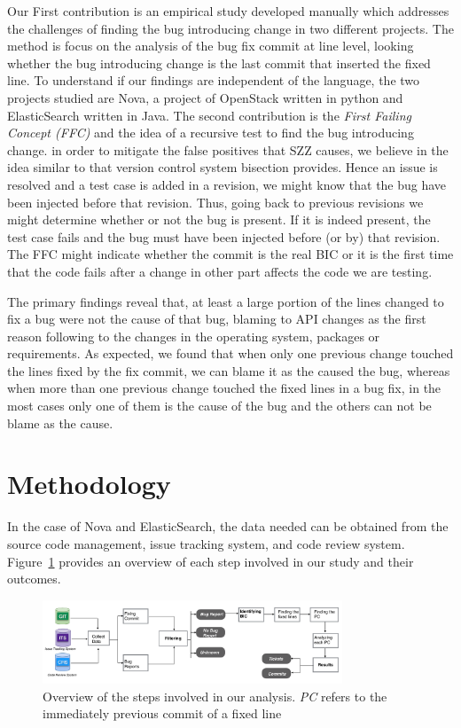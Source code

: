 \documentclass[conference]{IEEEtran}
\begin{document}
Our First contribution is an empirical study developed manually which addresses the challenges of finding the bug introducing change in two different projects. The method is focus on the analysis of the bug fix commit at line level, looking whether the bug introducing change is the last commit that inserted the fixed line. To understand if our findings are independent of the language, the two projects studied are Nova, a project of OpenStack written in python and ElasticSearch written in Java. The second contribution is the \emph{First Failing Concept (FFC)} and the idea of a recursive test to find the bug introducing change. in order to mitigate the false positives that SZZ causes, we believe in the idea similar to that version control system bisection provides. Hence an issue is resolved and a test case is added in a revision, we might know that the bug have been injected before that revision. Thus, going back to previous revisions we might determine whether or not the bug is present. If it is indeed present, the test case fails and the bug must have been injected before (or by) that revision. The FFC might indicate whether the commit is the real BIC or it is the first time that the code fails after a change in other part affects the code we are testing.

The primary findings reveal that, at least a large portion of the lines changed to fix a bug were not the cause of that bug, blaming to API changes as the first reason following to the changes in the operating system, packages or requirements. As expected, we found that when only one previous change touched the lines fixed by the fix commit, we can blame it as the caused the bug, whereas when more than one previous change touched the fixed lines in a bug fix, in the most cases only one of them is the cause of the bug and the others can not be blame as the cause.


\section{Methodology}
\label{sec:methodology}
In the case of Nova and ElasticSearch, the data needed can be obtained from the source code management, issue tracking system, and code review system. Figure~\ref{fig:diagram} provides an overview of each step involved in our study and their outcomes.
\begin{figure}[ht]
\centering
\includegraphics[height=2.5cm]{diagram.png}
\caption{Overview of the steps involved in our analysis. \emph{PC} refers to the immediately previous commit of a fixed line }
\label{fig:diagram}       %
\end{figure}
\end{document}
